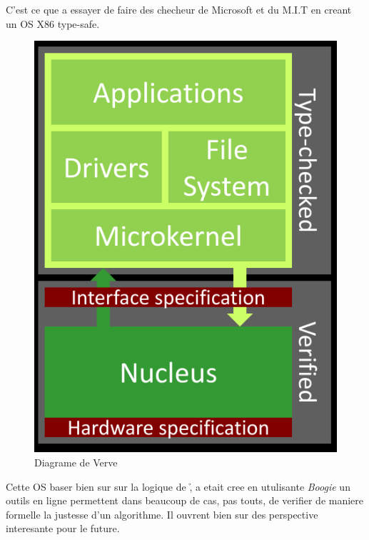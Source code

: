 \documentclass[French,Hoar.tex]{subfiles}
\begin{document}
  C'est ce que a essayer de faire des checheur de Microsoft et du M.I.T en creant un OS X86 type-safe.

  \begin{figure}[H]
    \centering
  \includegraphics[scale=0.2]{./img/Verve.png}
  \caption{Diagrame de Verve}
  \label{fig:Verve}
\end{figure}

  Cette OS baser bien sur sur la logique de \h, a etait cree en utulisante \emph{Boogie} un outils en ligne
  permettent dans beaucoup de cas, pas touts, de verifier de maniere formelle la justesse d'un algorithme.
  Il ouvrent bien sur des perspective interesante pour le future.
\end{document}
